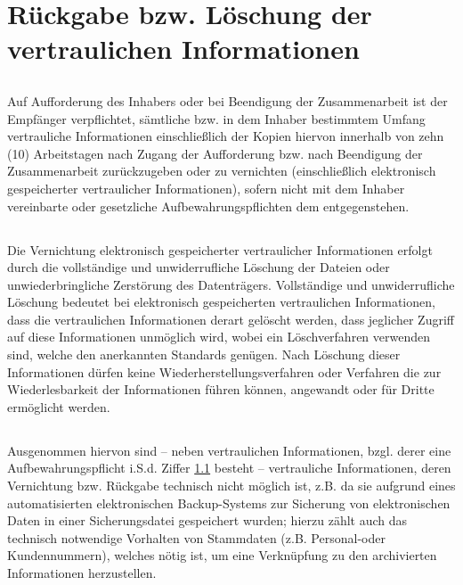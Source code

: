 \documentclass[10pt]{article}
\begin{document}
\section{Rückgabe bzw. Löschung der vertraulichen Informationen}

\subsection{} \label{ziff:4.1} Auf Aufforderung des Inhabers oder bei Beendigung der Zusammenarbeit ist der Empfänger verpflichtet, sämtliche bzw. in dem Inhaber bestimmtem Umfang vertrauliche Informationen einschließlich der Kopien hiervon innerhalb von zehn (10) Arbeitstagen nach Zugang der Aufforderung bzw. nach Beendigung der Zusammenarbeit zurückzugeben oder zu vernichten (einschließlich elektronisch gespeicherter vertraulicher Informationen), sofern nicht mit dem Inhaber vereinbarte oder gesetzliche Aufbewahrungspflichten dem entgegenstehen.

\subsection{} Die Vernichtung elektronisch gespeicherter vertraulicher Informationen erfolgt durch die vollständige und unwiderrufliche Löschung der Dateien oder unwiederbringliche Zerstörung des Datenträgers. Vollständige und unwiderrufliche Löschung bedeutet bei elektronisch gespeicherten vertraulichen Informationen, dass die vertraulichen Informationen derart gelöscht werden, dass jeglicher Zugriff auf diese Informationen unmöglich wird, wobei ein Löschverfahren verwenden sind, welche den anerkannten Standards genügen. Nach Löschung dieser Informationen dürfen keine Wiederherstellungsverfahren oder Verfahren die zur Wiederlesbarkeit der Informationen führen können, angewandt oder für Dritte ermöglicht werden.

\subsection{} Ausgenommen hiervon sind – neben vertraulichen Informationen, bzgl. derer eine Aufbewahrungspflicht i.S.d. Ziffer \ref{ziff:4.1} besteht – vertrauliche Informationen, deren Vernichtung bzw. Rückgabe technisch nicht möglich ist, z.B. da sie aufgrund eines automatisierten elektronischen Backup-Systems zur Sicherung von elektronischen Daten in einer Sicherungsdatei gespeichert wurden; hierzu zählt auch das technisch notwendige Vorhalten von Stammdaten (z.B. Personal-oder Kundennummern), welches nötig ist, um eine Verknüpfung zu den archivierten Informationen herzustellen. 
\end{document}
